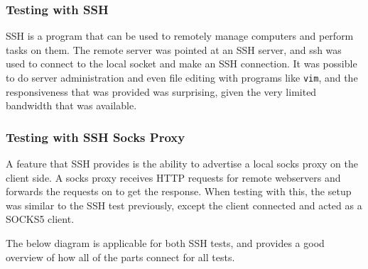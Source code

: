 \subsubsection{Testing with SSH}
SSH is a program that can be used to remotely manage computers and perform tasks on them.
The remote server was pointed at an SSH server, and ssh was used to connect to the local socket and make an SSH connection.
It was possible to do server administration and even file editing with programs like \texttt{vim}, and the responsiveness that was provided was surprising, given the very limited bandwidth that was available.

\subsubsection{Testing with SSH Socks Proxy}
A feature that SSH provides is the ability to advertise a local socks proxy on the client side.
A socks proxy receives HTTP requests for remote webservers and forwards the requests on to get the response.
When testing with this, the setup was similar to the SSH test previously, except the client connected and acted as a SOCKS5 client.

The below diagram is applicable for both SSH tests, and provides a good overview of how all of the parts connect for all tests.
\begin{center}
\end{center}

